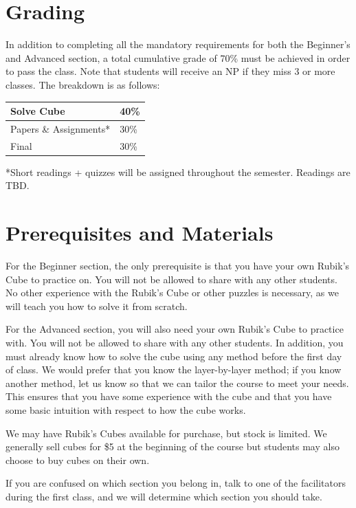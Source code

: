 \documentclass[11pt]{article}
\begin{document}
\section*{Grading}
In addition to completing all the mandatory requirements for both the Beginner’s and Advanced section, a total cumulative grade of 70\% must be achieved in order to pass the class. Note that students will receive an NP if they miss 3 or more classes. The breakdown is as follows:
\begin{center}
\begin{tabular}{l|l}
Solve Cube             & 40\% \\ \hline
Papers \& Assignments* & 30\% \\ \hline
Final                  & 30\%
\end{tabular}
\end{center}
\begin{footnotesize}
*Short readings + quizzes will be assigned throughout the semester. Readings are TBD. 
\end{footnotesize}

\section*{Prerequisites and Materials}
For the Beginner section, the only prerequisite is that you have your own Rubik’s Cube to practice on. You will not be allowed to share with any other students. No other experience with the Rubik’s Cube or other puzzles is necessary, as we will teach you how to solve it from scratch.

For the Advanced section, you will also need your own Rubik’s Cube to practice with. You will not be allowed to share with any other students. In addition, you must already know how to solve the cube using any method before the first day of class. We would prefer that you know the layer-by-layer method; if you know another method, let us know so that we can tailor the course to meet your needs. This ensures that you have some experience with the cube and that you have some basic intuition with respect to how the cube works.

We may have Rubik’s Cubes available for purchase, but stock is limited. We generally sell cubes for \$5 at the beginning of the course but students may also choose to buy cubes on their own.

If you are confused on which section you belong in, talk to one of the facilitators during the first class, and we will determine which section you should take.
\end{document}
